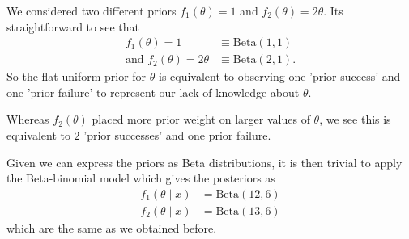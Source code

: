 \documentclass[10pt, a4paper]{article}
\begin{document}
\begin{example}
    We considered two different priors $f_1(\theta) = 1$ and $f_2(\theta) = 2\theta$.
    Its straightforward to see that
    \begin{align*}
        f_1(\theta) = 1 &\equiv \mathrm{Beta}(1, 1) \\
        \text{and } f_2(\theta) = 2\theta &\equiv \mathrm{Beta}(2, 1).
    \end{align*}
    So the flat uniform prior for $\theta$ is equivalent to observing one 'prior success' and one 'prior failure' to represent our lack of knowledge about $\theta$.

    Whereas $f_2(\theta)$ placed more prior weight on larger values of $\theta$,
    we see this is equivalent to $2$ 'prior successes' and one prior failure.

    Given we can express the priors as Beta distributions,
    it is then trivial to apply the Beta-binomial model which gives the posteriors as
    \begin{align*}
        f_1(\theta\mid x) &= \mathrm{Beta}(12, 6) \\
        f_2(\theta\mid x) &= \mathrm{Beta}(13, 6)
    \end{align*}
    which are the same as we obtained before.
\end{example}
\end{document}
